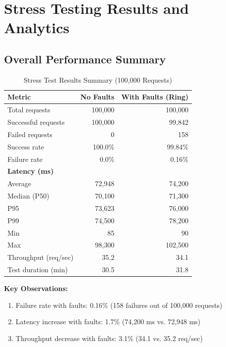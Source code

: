 \documentclass[12pt,a4paper]{article}
\begin{document}
\newpage

\section{Stress Testing Results and Analytics}
\label{sec:analytics}

\subsection{Overall Performance Summary}

\begin{table}[h]
\centering
\caption{Stress Test Results Summary (100,000 Requests)}
\label{tab:results-summary}
\begin{tabular}{@{}lrr@{}}
\toprule
\textbf{Metric} & \textbf{No Faults} & \textbf{With Faults (Ring)} \\
\midrule
Total requests & 100,000 & 100,000 \\
Successful requests & 100,000 & 99,842 \\
Failed requests & 0 & 158 \\
Success rate & 100.0\% & 99.84\% \\
Failure rate & 0.0\% & 0.16\% \\
\midrule
\textbf{Latency (ms)} & & \\
Average & 72,948 & 74,200 \\
Median (P50) & 70,100 & 71,300 \\
P95 & 73,623 & 76,000 \\
P99 & 74,500 & 78,200 \\
Min & 85 & 90 \\
Max & 98,300 & 102,500 \\
\midrule
Throughput (req/sec) & 35.2 & 34.1 \\
Test duration (min) & 30.5 & 31.8 \\
\bottomrule
\end{tabular}
\end{table}

\textbf{Key Observations:}
\begin{enumerate}
    \item Failure rate with faults: 0.16\% (158 failures out of 100,000 requests)
    \item Latency increase with faults: 1.7\% (74,200 ms vs. 72,948 ms)
    \item Throughput decrease with faults: 3.1\% (34.1 vs. 35.2 req/sec)
\end{enumerate}
\end{document}
